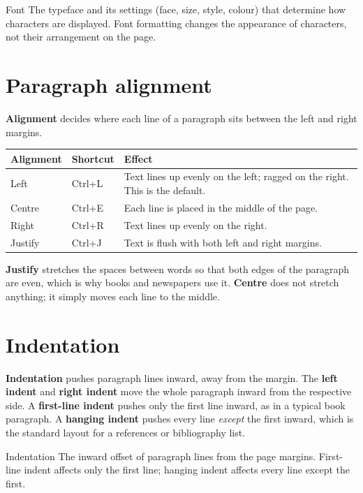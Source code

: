 \begin{definitionbox}{Font}
The typeface and its settings (face, size, style, colour) that determine how
characters are displayed. Font formatting changes the appearance of
characters, not their arrangement on the page.
\end{definitionbox}

\section{Paragraph alignment}
\textbf{Alignment} decides where each line of a paragraph sits between the
left and right margins.

\begin{center}
\begin{tabular}{p{}p{}p{}}
\toprule
\textbf{Alignment} & \textbf{Shortcut} & \textbf{Effect} \\
\midrule
Left & Ctrl+L & Text lines up evenly on the left; ragged on the right. This is the default. \\
Centre & Ctrl+E & Each line is placed in the middle of the page. \\
Right & Ctrl+R & Text lines up evenly on the right. \\
Justify & Ctrl+J & Text is flush with both left and right margins. \\
\bottomrule
\end{tabular}
\end{center}

\textbf{Justify} stretches the spaces between words so that both edges of
the paragraph are even, which is why books and newspapers use it.
\textbf{Centre} does not stretch anything; it simply moves each line to the
middle.

\section{Indentation}
\textbf{Indentation} pushes paragraph lines inward, away from the margin.
The \textbf{left indent} and \textbf{right indent} move the whole paragraph
inward from the respective side. A \textbf{first-line indent} pushes only
the first line inward, as in a typical book paragraph. A \textbf{hanging
indent} pushes every line \emph{except} the first inward, which is the
standard layout for a references or bibliography list.

\begin{definitionbox}{Indentation}
The inward offset of paragraph lines from the page margins. First-line
indent affects only the first line; hanging indent affects every line except
the first.
\end{definitionbox}

